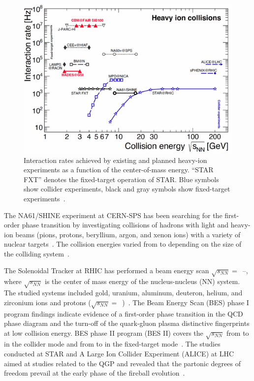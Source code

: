 \begin{figure}[!h]
    \centering
    \includegraphics[width=0.7\columnwidth]{Chapter1/images/interaction_rates.png}
    \caption{Interaction rates achieved by existing and planned heavy-ion experiments as a function of the center-of-mass energy. “STAR FXT” denotes the fixed-target operation of STAR.  Blue symbols show collider experiments, black and gray symbols show fixed-target experiments~\cite{Ablyazimov_2017}.}
    \label{fig:cbm_rates}
\end{figure}

The NA61/SHINE experiment at CERN-SPS has been searching for the first-order phase transition by investigating collisions of hadrons with light and heavy-ion beams (pions, protons, beryllium, argon, and xenon ions) with a variety of nuclear targets~\cite{CBM_physics, Turko:2301677}. The collision energies varied from  to  depending on the size of the colliding system~\cite{na61energy}. 

The Solenoidal Tracker at \gls{RHIC} has
performed a beam energy scan $\sqrt{s_{NN}} =$~--, where $\sqrt{s_{NN}}$ is the center of mass energy of the nucleus-nucleus (NN) system. The studied systems included gold, uranium, aluminum, deuteron, helium, and zirconium ions and protons ($\sqrt{s_{NN}}=$~)~\cite{Stefaniak:2022dxo}. The Beam Energy Scan (\gls{BES}) phase I program findings indicate evidence of a first-order phase transition in the QCD phase diagram and the turn-off of the quark-gluon plasma distinctive fingerprints at low collision energy. BES phase II program (BES II) covers the $\sqrt{s_{NN}}$ from  to  in the collider mode and from  to  in the fixed-target mode~\cite{STAR2, STAR1}.
The studies conducted at \gls{STAR} and A Large Ion Collider Experiment (\gls{ALICE}) at \gls{LHC} aimed at studies related to the \gls{QGP} and revealed that the partonic degrees of freedom prevail at the early phase of the fireball evolution~\cite{CBM_physics}.



